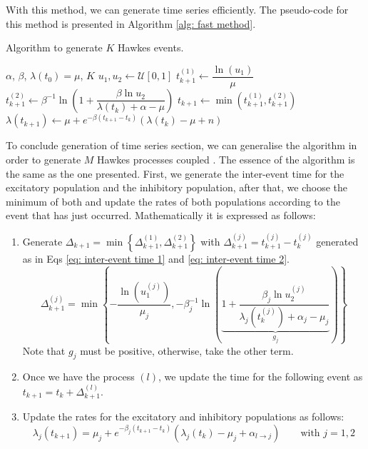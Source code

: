 With this method, we can generate time series efficiently. The pseudo-code for this method is presented in Algorithm \ref{alg: fast method}.
\begin{algorithm}
    \caption{Algorithm to generate $K$ Hawkes events.}\label{alg: fast method}
    \begin{algorithmic}
        \Require $\alpha$, $\beta$, $\lambda(t_0)=\mu$, $K$
            \State $u_1,u_2 \gets \mathcal{U}[0,1]$
            \State $t_{k+1}^{(1)}\gets \dfrac{\ln(u_1)}{\mu}$
            \State $t_{k+1}^{(2)} \gets \beta^{-1}\ln\left( 1+\dfrac{\beta\ln u_2}{\lambda(t_k)+\alpha-\mu} \right)$
            \State $t_{k+1} \gets \min\left( t_{k+1}^{(1)},t_{k+1}^{(2)} \right)$
            \State $\lambda(t_{k+1}) \gets \mu + e^{-\beta(t_{k+1}-t_k)}\left( \lambda(t_k)-\mu+n \right)$
        \EndFor
    \end{algorithmic}
\end{algorithm}

To conclude generation of time series section, we can generalise the algorithm in order to generate $M$ Hawkes processes coupled \cite{dassios2013exact,laub2021elements}. 
The essence of the algorithm is the 
same as the one presented. First, we generate the inter-event time for the excitatory population and the inhibitory population, after that, we choose the minimum of both and update the
rates of both populations according to the event that has just occurred. Mathematically it is expressed as follows:

\begin{enumerate}
    \item Generate $\Delta_{k+1} = \min\left\{ \Delta_{k+1}^{(1)},\Delta_{k+1}^{(2)} \right\}$ with $\Delta_{k+1}^{(j)}=t_{k+1}^{(j)}-t_k^{(j)}$ generated 
    as in Eqs \ref{eq: inter-event time 1} and \ref{eq: inter-event time 2}.
    \begin{equation}
        \Delta_{k+1}^{(j)} = \min \left\{ -\dfrac{\ln(u_1^{(j)})}{\mu_j},-\beta_j^{-1}\ln\left( \underbrace{1+\dfrac{\beta_j\ln u_2^{(j)}}{\lambda_j\left( t_k^{(j)} \right)+\alpha_j-\mu_j}}_{g_j} \right) \right\}
        \label{eq: inter-event time coupled}
    \end{equation}
    Note that $g_j$ must be positive, otherwise, take the other term.
    \item Once we have the process $(l)$, we update the time for the following event as $t_{k+1}=t_k+\Delta_{k+1}^{(l)}$.
    \item Update the rates for the excitatory and inhibitory populations as follows:
    \begin{equation}
        \lambda_j(t_{k+1}) = \mu_j + e^{-\beta_j(t_{k+1}-t_k)}\left( \lambda_j(t_k)-\mu_j+\alpha_{l\to j} \right) \qquad \text{with } j=1,2
    \end{equation}
\end{enumerate}

